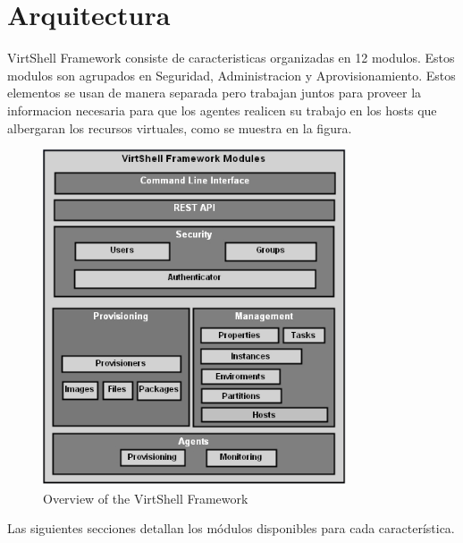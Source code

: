 \section{Arquitectura}
VirtShell Framework consiste de caracteristicas organizadas en 12 modulos. Estos modulos son agrupados en Seguridad, Administracion y Aprovisionamiento. Estos elementos se usan de manera separada pero trabajan juntos para proveer la informacion necesaria para que los agentes realicen su trabajo en los hosts que albergaran los recursos virtuales, como se muestra en la figura. \\

\begin{figure}
	\caption{Overview of the VirtShell Framework}
	\includegraphics[width = 0.8\textwidth]{../architecture/v1/diagrams/framework}
\end{figure}

Las siguientes secciones detallan los módulos disponibles para cada característica. 

